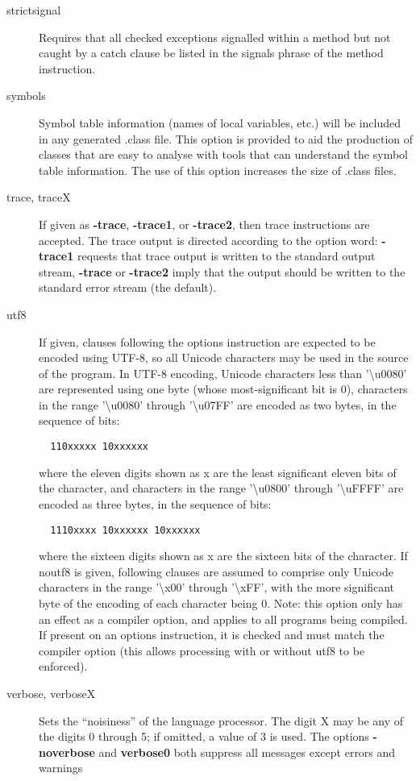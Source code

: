 \begin{description}
\item[strictsignal]
Requires that all checked exceptions signalled within a method but not caught by a catch clause be listed in the signals phrase of the method instruction.
\item[symbols]
Symbol table information (names of local variables, etc.) will be included in any generated .class file. This option is provided to aid the production of classes that are easy to analyse with tools that can understand the symbol table information. The use of this option increases the size of .class files.
\item[trace, traceX]
If given as \textbf{-trace}, \textbf{-trace1}, or \textbf{-trace2}, then trace instructions are accepted. The trace output is directed according to the option word: \textbf{-trace1} requests that trace output is written to the standard output stream, \textbf{-trace} or \textbf{-trace2} imply that the output should be written to the standard error stream (the default).
\item[utf8]
If given, clauses following the options instruction are expected to be encoded using UTF-8, so all Unicode characters may be used in the source of the program.
In UTF-8 encoding, Unicode characters less than '\textbackslash u0080' are represented using one byte (whose most-significant bit is 0), characters in the range '\textbackslash u0080' through '\textbackslash u07FF' are encoded as two bytes, in the sequence of bits:
\begin{verbatim}
  110xxxxx 10xxxxxx
\end{verbatim}
where the eleven digits shown as x are the least significant eleven bits of the character, and characters in the range '\textbackslash u0800' through '\textbackslash uFFFF' are encoded as three bytes, in the sequence of bits:
\begin{verbatim}
  1110xxxx 10xxxxxx 10xxxxxx
\end{verbatim}
where the sixteen digits shown as x are the sixteen bits of the character.
If noutf8 is given, following clauses are assumed to comprise only Unicode characters in the range '\textbackslash x00' through '\textbackslash xFF', with the more significant byte of the encoding of each character being 0.
Note: this option only has an effect as a compiler option, and applies to all programs being compiled. If present on an options instruction, it is checked and must match the compiler option (this allows processing with or without utf8 to be enforced).
\item[verbose, verboseX]
Sets the “noisiness” of the language processor. The digit X may be any of the digits 0 through 5; if omitted, a value of 3 is used. The options \textbf{-noverbose} and \textbf{verbose0} both suppress all messages except errors and warnings
\end{description}

